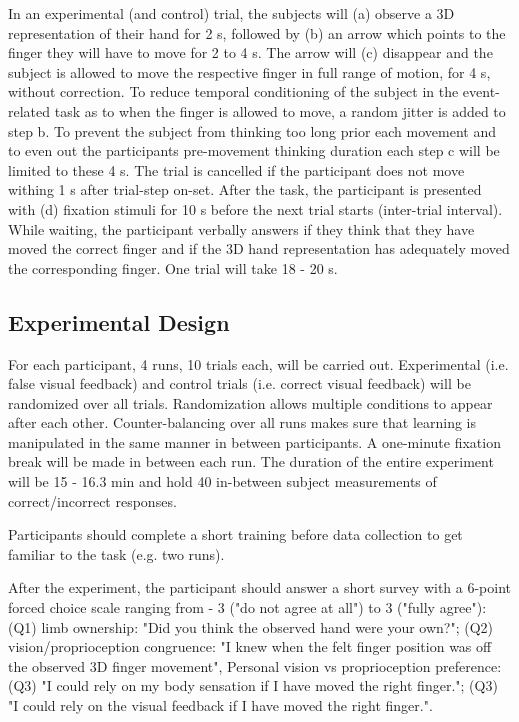 \documentclass[man]{apa7}
\begin{document}
In an experimental (and control) trial, the subjects will (a) observe a 3D representation of their hand for 2 s, followed by (b) an arrow which points to the finger they will have to move for 2 to 4 s. The arrow will (c) disappear and the subject is allowed to move the respective finger in full range of motion, for 4 s, without correction. To reduce temporal conditioning of the subject in the event-related task as to when the finger is allowed to move, a random jitter is added to step b. To prevent the subject from thinking too long prior each movement and to even out the participants pre-movement thinking duration each step c will be limited to these 4 s. The trial is cancelled if the participant does not move withing 1 s after trial-step on-set. After the task, the participant is presented with (d) fixation stimuli for 10 s before the next trial starts (inter-trial interval). While waiting, the participant verbally answers if they think that they have moved the correct finger and if the 3D hand representation has adequately moved the corresponding finger. One trial will take 18 - 20 s.

\subsection{Experimental Design}

For each participant, 4 runs, 10 trials each, will be carried out. Experimental (i.e. false visual feedback) and control trials (i.e. correct visual feedback) will be randomized over all trials. Randomization allows multiple conditions to appear after each other. Counter-balancing over all runs makes sure that learning is manipulated in the same manner in between participants. A one-minute fixation break will be made in between each run. The duration of the entire experiment will be 15 - 16.3 min and hold 40 in-between subject measurements of correct/incorrect responses.

Participants should complete a short training before data collection to get familiar to the task (e.g. two runs).

After the experiment, the participant should answer a short survey with a 6-point forced choice scale ranging from - 3 ("do not agree at all") to 3 ("fully agree"): (Q1) limb ownership: "Did you think the observed hand were your own?"; (Q2) vision/proprioception congruence: "I knew when the felt finger position was off the observed 3D finger movement", Personal vision vs proprioception preference: (Q3) "I could rely on my body sensation if I have moved the right finger."; (Q3) "I could rely on the visual feedback if I have moved the right finger.".
\end{document}
